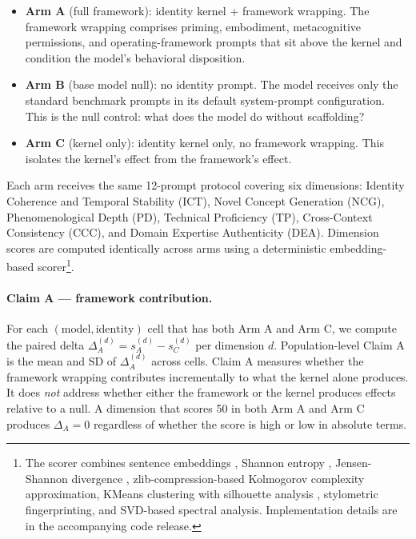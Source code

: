 \documentclass[11pt]{article}
\begin{document}
\begin{itemize}
    \item \textbf{Arm A} (full framework): identity kernel + framework wrapping. The framework wrapping comprises priming, embodiment, metacognitive permissions, and operating-framework prompts that sit above the kernel and condition the model's behavioral disposition.
    \item \textbf{Arm B} (base model null): no identity prompt. The model receives only the standard benchmark prompts in its default system-prompt configuration. This is the null control: what does the model do without scaffolding?
    \item \textbf{Arm C} (kernel only): identity kernel only, no framework wrapping. This isolates the kernel's effect from the framework's effect.
\end{itemize}
Each arm receives the same 12-prompt protocol covering six dimensions: Identity Coherence and Temporal Stability (ICT), Novel Concept Generation (NCG), Phenomenological Depth (PD), Technical Proficiency (TP), Cross-Context Consistency (CCC), and Domain Expertise Authenticity (DEA). Dimension scores are computed identically across arms using a deterministic embedding-based scorer\footnote{The scorer combines sentence embeddings \citep{reimers2019sentence}, Shannon entropy \citep{shannon1948mathematical}, Jensen-Shannon divergence \citep{lin1991divergence}, zlib-compression-based Kolmogorov complexity approximation, KMeans clustering with silhouette analysis \citep{rousseeuw1987silhouettes}, stylometric fingerprinting, and SVD-based spectral analysis. Implementation details are in the accompanying code release.}.

\paragraph{Claim A --- framework contribution.}
For each $(\text{model}, \text{identity})$ cell that has both Arm A and Arm C, we compute the paired delta $\Delta_A^{(d)} = s_A^{(d)} - s_C^{(d)}$ per dimension $d$. Population-level Claim A is the mean and SD of $\Delta_A^{(d)}$ across cells. Claim A measures whether the framework wrapping contributes incrementally to what the kernel alone produces. It does \emph{not} address whether either the framework or the kernel produces effects relative to a null. A dimension that scores 50 in both Arm A and Arm C produces $\Delta_A = 0$ regardless of whether the score is high or low in absolute terms.
\end{document}
